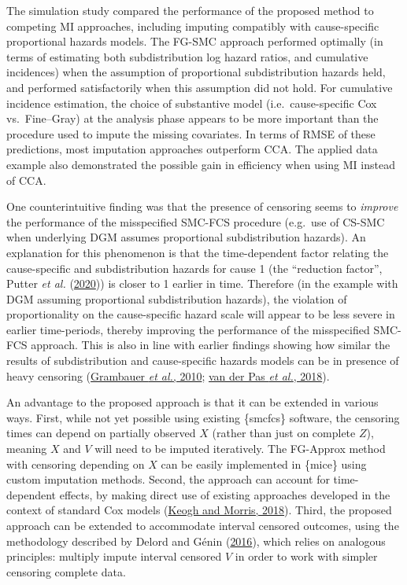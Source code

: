 \documentclass[
  letterpaper,
  DIV=11,
  numbers=noendperiod]{scrreprt}
\begin{document}
The simulation study compared the performance of the proposed method to
competing MI approaches, including imputing compatibly with
cause-specific proportional hazards models. The FG-SMC approach
performed optimally (in terms of estimating both subdistribution log
hazard ratios, and cumulative incidences) when the assumption of
proportional subdistribution hazards held, and performed satisfactorily
when this assumption did not hold. For cumulative incidence estimation,
the choice of substantive model (i.e.~cause-specific Cox vs.~Fine--Gray)
at the analysis phase appears to be more important than the procedure
used to impute the missing covariates. In terms of RMSE of these
predictions, most imputation approaches outperform CCA. The applied data
example also demonstrated the possible gain in efficiency when using MI
instead of CCA.

One counterintuitive finding was that the presence of censoring seems to
\emph{improve} the performance of the misspecified SMC-FCS procedure
(e.g.~use of CS-SMC when underlying DGM assumes proportional
subdistribution hazards). An explanation for this phenomenon is that the
time-dependent factor relating the cause-specific and subdistribution
hazards for cause 1 (the ``reduction factor'', Putter \emph{et al.}
(\protect\hyperlink{ref-putterRelationCausespecificHazard2020}{2020}))
is closer to 1 earlier in time. Therefore (in the example with DGM
assuming proportional subdistribution hazards), the violation of
proportionality on the cause-specific hazard scale will appear to be
less severe in earlier time-periods, thereby improving the performance
of the misspecified SMC-FCS approach. This is also in line with earlier
findings showing how similar the results of subdistribution and
cause-specific hazards models can be in presence of heavy censoring
(\protect\hyperlink{ref-grambauerProportionalSubdistributionHazards2010}{Grambauer
\emph{et al.}, 2010};
\protect\hyperlink{ref-vanderpasDifferentCompetingRisks2018}{van der Pas
\emph{et al.}, 2018}).

An advantage to the proposed approach is that it can be extended in
various ways. First, while not yet possible using existing \{smcfcs\}
software, the censoring times can depend on partially observed \(X\)
(rather than just on complete \(Z\)), meaning \(X\) and \(V\) will need
to be imputed iteratively. The FG-Approx method with censoring depending
on \(X\) can be easily implemented in \{mice\} using custom imputation
methods. Second, the approach can account for time-dependent effects, by
making direct use of existing approaches developed in the context of
standard Cox models
(\protect\hyperlink{ref-keoghMultipleImputationCox2018}{Keogh and
Morris, 2018}). Third, the proposed approach can be extended to
accommodate interval censored outcomes, using the methodology described
by Delord and Génin
(\protect\hyperlink{ref-delordMultipleImputationCompeting2016}{2016}),
which relies on analogous principles: multiply impute interval censored
\(V\) in order to work with simpler censoring complete data.
\end{document}
